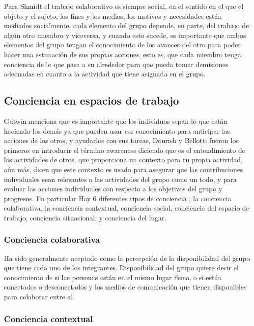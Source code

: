 Para Shmidt \cite{schmidt1992taking} el trabajo colaborativo es siempre social, en el sentido en el que el objeto y el sujeto, los fines y los medios, los motivos y necesidades est\'an mediados socialmente, cada elemento del grupo depende, en parte, del trabajo de alg\'un otro miembro y viceversa, y cuando esto sucede, es importante que ambos elementos del grupo tengan el conocimiento de los avances del otro para poder hacer una estimaci\'on de sus propias acciones, esto es, que cada miembro tenga conciencia de lo que pasa a su alrededor para que pueda tomar demisiones adecuadas en cuanto a la actividad que tiene asignada en el grupo.

\subsection{Conciencia en espacios de trabajo}

Gutwin \cite{gutwin1996supporting} menciona que es importante que los individuos sepan lo que est\'an haciendo los dem\'as ya que pueden usar ese conocimiento para anticipar las acciones de los otros, y ayudarlos con sus tareas, Dourish y Bellotti \cite{dourish1992awareness} fueron los primeros en introducir el t\'ermino awareness diciendo que es el entendimiento de las actividades de otros, que proporciona un contexto para tu propia actividad, a\'un m\'as, dicen que este contexto es usado para asegurar que las contribuciones individuales sean relevantes a las actividades del grupo como un todo, y para evaluar las acciones individuales con respecto a los objetivos del grupo y progresos. En particular Hay 6 diferentes tipos de conciencia \cite{antunes2014reviewing}; la conciencia colaborativa, la conciencia contextual, conciencia social, conciencia del espacio de trabajo, conciencia situacional, y conciencia del lugar.

\subsubsection{Conciencia colaborativa}

Ha sido generalmente aceptado como la percepci\'on de la disponibilidad del grupo que tiene cada uno de los integrantes. Disponibilidad del grupo quiere decir el conocimiento de si las personas est\'an en el mismo lugar f\'isico, o si est\'an conectados o desconectados y los medios de comunicaci\'on que tienen disponibles para colaborar entre s\'i.

\subsubsection{Conciencia contextual}

